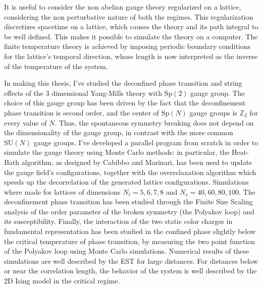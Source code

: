 \documentclass[reqno,11pt]{article}
\numberwithin{equation}{section}
\newcommand{\SU}{\mathrm{SU}}
\newcommand{\Sp}{\mathrm{Sp}}
\begin{document}
It is useful to consider the non abelian gauge theory regularized on a lattice, considering the non perturbative nature
of both the regimes. This regularization discretizes spacetime on a lattice, which causes the theory and its path integral
to be well defined. This makes it possible to simulate the theory on a computer. The finite temperature theory is achieved
by imposing periodic boundary conditions for the lattice's temporal direction, whose length is now interpreted
as the inverse of the temperature of the system. 

In making this thesis, I've studied the deconfined phase transition and string effects of the 3 dimensional Yang-Mills theory 
with $\Sp(2)$ gauge group. The choice of this gauge group has been driven by the fact that the deconfinement phase transition
is second order, and the center of $\Sp(N)$ gauge groups is $\mathbb{Z}_2$ for every value of $N$. 
Thus, the spontaneous symmetry breaking does not depend on the dimensionality of the gauge group,
in contrast with the more common $\SU(N)$ gauge groups. I've developed a parallel program from scratch in order to simulate
the gauge theory using Monte Carlo methods: in particular, the Heat-Bath algorithm, as designed by Cabibbo and Marinari, has been
used to update the gauge field's configurations, together with the overrelaxation algorithm which speeds up the
decorrelation of the generated lattice configurations. Simulations where made for lattices of dimensions 
$N_t = 5, 6, 7, 8$ and $N_s = 40, 60, 80, 100$. The deconfinement phase transition has been studied through
the Finite Size Scaling analysis of the order parameter of the broken symmetry (the Polyakov loop) and its susceptibility. 
Finally, the interaction of the two static color charges in fundamental representation has been studied in the
confined phase slightly below the critical temperature of phase transition, by measuring the two point function of the Polyakov
loop using Monte Carlo simulations. Numerical results of these simulations are well described by the EST for large
distances. For distances below or near the correlation length, the behavior of the system is well described by the
2D Ising model in the critical regime.    
\end{document}
